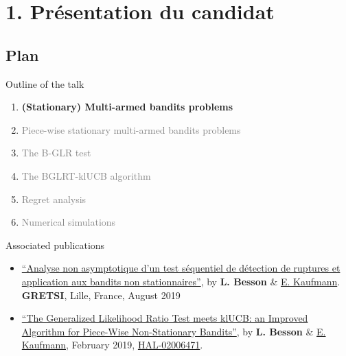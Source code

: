 \documentclass[11pt,english,ignorenonframetext,]{beamer}
\begin{document}
\section{\hfill{}1. Présentation du candidat\hfill{}}

\subsection{\hfill{}Plan\hfill{}}

\begin{frame}{Outline of the talk}

\begin{enumerate}
\item
\alert{\textbf{%
  (Stationary) Multi-armed bandits problems
}}
\vspace*{15pt}

\item
\textcolor{gray}{
  Piece-wise stationary multi-armed bandits problems
}
\vspace*{15pt}

\item
\textcolor{gray}{
  The B-GLR test
}
\vspace*{15pt}

\item
\textcolor{gray}{
  The BGLRT-klUCB algorithm
}
\vspace*{15pt}

\item
\textcolor{gray}{
  Regret analysis
}
\vspace*{15pt}

\item
\textcolor{gray}{
  Numerical simulations
}
\end{enumerate}

\end{frame}


\begin{frame}{Associated publications}

\begin{itemize}
\item
  \href{https://hal.inria.fr/hal-02006471/document}{``Analyse non asymptotique d'un test séquentiel de détection de ruptures et application aux bandits non stationnaires''}, by \textbf{L. Besson} \&
  \href{http://chercheurs.lille.inria.fr/ekaufman/research.html}{E.
  Kaufmann}.
  \textbf{GRETSI}, Lille, France, August 2019

\end{itemize}

\begin{itemize}

\item
  \href{https://hal.inria.fr/hal-02006471/document}{``The Generalized Likelihood Ratio Test meets klUCB: an Improved Algorithm for Piece-Wise Non-Stationary Bandits''}, by \textbf{L. Besson} \&
  \href{http://chercheurs.lille.inria.fr/ekaufman/research.html}{E.
  Kaufmann}, February 2019,
  \href{https://hal.inria.fr/hal-02006471}{HAL-02006471}.

\end{itemize}

\end{frame}
\end{document}
